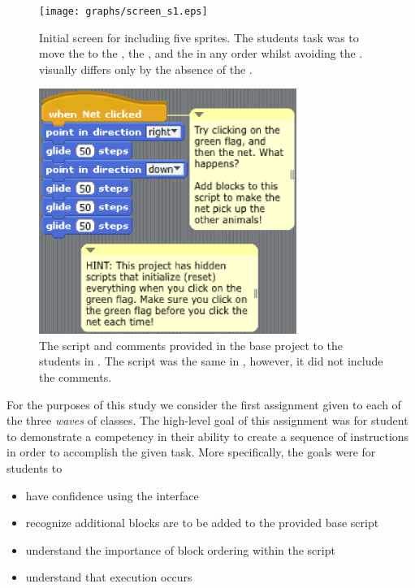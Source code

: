 \begin{figure}[!t]
\centering \texttt{[image: graphs/screen\_s1.eps]}
\caption{Initial screen for \sone{} including five sprites. The students task
  was to move the \net{} to \catch{} the \bear{}, the \horse{}, and the
  \zebra{} in any order whilst avoiding the \snake{}. \stwo{} visually differs
  only by the absence of the \snake{}.}
\end{figure}


\begin{figure}[!t]
\centering \includegraphics[width=3.3in]{graphs/screen_blocks.eps}
\caption{The script and comments provided in the base project to the students
  in \stwo{}. The script was the same in \sone{}, however, it did not include
  the comments.}
\end{figure}


For the purposes of this study we consider the first assignment given to each
of the three \emph{waves} of classes. The high-level goal of this assignment
was for student to demonstrate a competency in their ability to create a
sequence of instructions in order to accomplish the given task. More
specifically, the goals were for students to

\begin{itemize}
\item have confidence using the interface
\item recognize additional blocks are to be added to the provided base script
\item understand the importance of block ordering within the script
\item understand that execution occurs \netclicked{}
\end{itemize}

